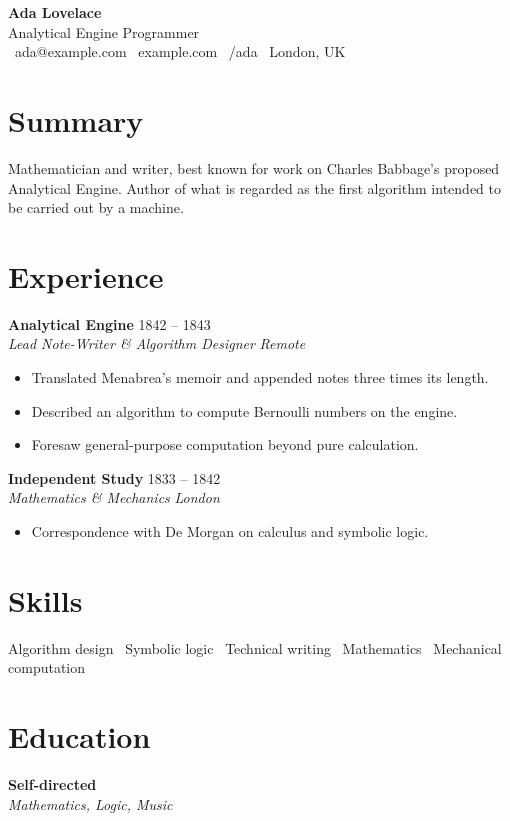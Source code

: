 \documentclass[11pt,a4paper]{article}
\newcommand{\entry}[4]{%
  \noindent\textbf{#1} \hfill {\color{accent}#2}\\
  \textit{#3} \hfill \textit{#4}\par\vspace{2pt}}
\begin{document}
{\Huge\bfseries Ada Lovelace}\\[2pt]
{\color{accent}\large Analytical Engine Programmer}\\[4pt]
\faEnvelope\ ada@example.com \quad
\faGlobe\ example.com \quad
\faGithub\ /ada \quad
\faMapMarker*\ London, UK

\section{Summary}
Mathematician and writer, best known for work on Charles Babbage's proposed
Analytical Engine. Author of what is regarded as the first algorithm intended
to be carried out by a machine.

\section{Experience}
\entry{Analytical Engine}{1842 -- 1843}{Lead Note-Writer \& Algorithm Designer}{Remote}
\begin{itemize}
  \item Translated Menabrea's memoir and appended notes three times its length.
  \item Described an algorithm to compute Bernoulli numbers on the engine.
  \item Foresaw general-purpose computation beyond pure calculation.
\end{itemize}
\vspace{4pt}
\entry{Independent Study}{1833 -- 1842}{Mathematics \& Mechanics}{London}
\begin{itemize}
  \item Correspondence with De Morgan on calculus and symbolic logic.
\end{itemize}

\section{Skills}
Algorithm design \textbullet\ Symbolic logic \textbullet\ Technical writing
\textbullet\ Mathematics \textbullet\ Mechanical computation

\section{Education}
\entry{Self-directed}{}{Mathematics, Logic, Music}{}
\end{document}
